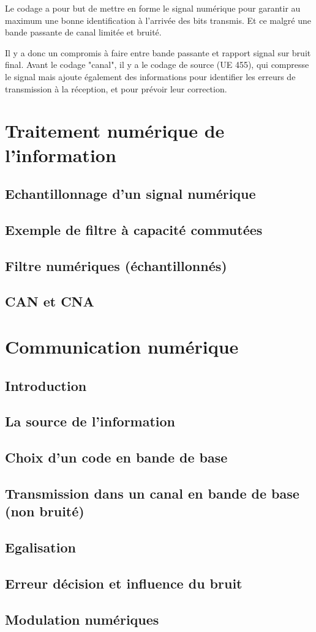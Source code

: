 \documentclass[openany]{../../cours}
\begin{document}
Le codage a pour but de mettre en forme le signal numérique pour garantir au maximum une bonne identification à l'arrivée des bits transmis. Et ce malgré une bande passante de canal limitée et bruité.

Il y a donc un compromis à faire entre bande passante et rapport signal sur bruit final. Avant le codage "canal", il y a le codage de source (UE 455), qui compresse le signal mais ajoute également des informations pour identifier les erreurs de transmission à la réception, et pour prévoir leur correction.

\part{Traitement numérique de l'information}
\chapter{Echantillonnage d'un signal numérique}

\chapter{Exemple de filtre à capacité commutées}

\chapter{Filtre numériques (échantillonnés)}

\chapter{CAN et CNA}


\part{Communication numérique}
\chapter{Introduction}

\chapter{La source de l'information}

\chapter{Choix d'un code en bande de base}

\chapter{Transmission dans un canal en bande de base (non bruité)}

\chapter{Egalisation}

\chapter{Erreur décision et influence du bruit}

\chapter{Modulation numériques}

\end{document}
